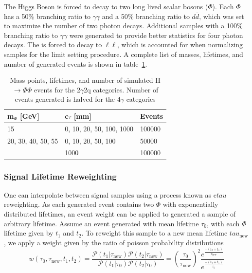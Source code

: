 The Higgs Boson is forced to decay to two long lived scalar bosons ($\Phi$). Each $\Phi$ has a 50\% branching ratio to $\gamma\gamma$ and a 50\% branching ratio to $d\bar{d}$, which was set to maximize the number of two photon decays. Additional samples with a 100\% branching ratio to $\gamma\gamma$ were generated to provide better statistics for four photon decays. The \VZ is forced to decay to $\ell\ell$, which is accounted for when normalizing samples for the limit setting procedure. A complete list of masses, lifetimes, and number of generated events is shown in table~\ref{tab:sigsamples}.

\begin{table}[htb!]
	\caption[Mass points, lifetimes, and number of simulated H $\rightarrow \Phi\Phi$ events for the 2$\gamma$2q categories. Number of events generated is halved for the 4$\gamma$ categories]{Mass points, lifetimes, and number of simulated H $\rightarrow \Phi\Phi$ events for the 2$\gamma$2q categories. Number of events generated is halved for the 4$\gamma$ categories}
	\label{tab:sigsamples}
	\begin{center}
		\begin{tabular}{l|l|l}
			\hline
			m$_\Phi$ [GeV] & c$\tau$ [mm] &  Events\\
			\hline
			15 & 0, 10, 20, 50, 100, 1000 & 100000\\
			\hline
			20, 30, 40, 50, 55 & 0, 10, 20, 50, 100 & 50000\\
			& 1000 & 100000\\
			\hline
		\end{tabular}
	\end{center}
\end{table}

\subsubsection{Signal Lifetime Reweighting} \label{sec:ana_ctau}
One can interpolate between signal samples using a process known as c$tau$ reweighting. As each generated event contains two $\Phi$ with exponentially distributed lifetimes, an event weight can be applied to generated a sample of arbitrary lifetime. Assume an event generated with mean lifetime $\tau_0$, with each $\Phi$ lifetime given by $t_1$ and $t_2$. To reweight this sample to a new mean lifetime $tau_\mathrm{new}$, we apply a weight given by the ratio of poisson probability distributions
\begin{equation}\label{eq:ctreweight}
	w(\tau_0, \tau_{\mathrm{new}}, t_1, t_2) =\frac{\mathcal{P}(t_1|\tau_\mathrm{new})\mathcal{P}(t_2|\tau_\mathrm{new})}{\mathcal{P}(t_1|\tau_0)\mathcal{P}(t_2|\tau_0)}= \left(\frac{\tau_0}{\tau_{\mathrm{new}}}\right)^2 \frac{e^{\frac{-(t_2+t_1)}{\tau_{\mathrm{new}}}}}{e^{\frac{-(t_2+t_1)}{\tau_0}}}
\end{equation}

